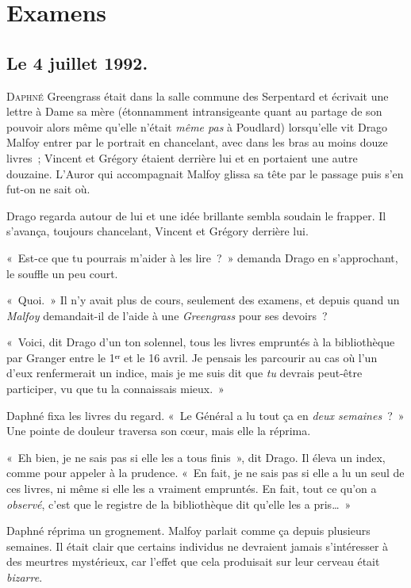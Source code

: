 \chapter{Examens}

\section{Le 4 juillet 1992.}

\lettrine{D}{aphné} Greengrass était dans la salle commune des Serpentard et écrivait une lettre à Dame sa mère (étonnamment intransigeante quant au partage de son pouvoir alors même qu'elle n'était \emph{même pas} à Poudlard) lorsqu'elle vit Drago Malfoy entrer par le portrait en chancelant, avec dans les bras au moins douze livres~; Vincent et Grégory étaient derrière lui et en portaient une autre douzaine. L'Auror qui accompagnait Malfoy glissa sa tête par le passage puis s'en fut-on ne sait où.

Drago regarda autour de lui et une idée brillante sembla soudain le frapper. Il s'avança, toujours chancelant, Vincent et Grégory derrière lui.

«~Est-ce que tu pourrais m'aider à les lire~?~» demanda Drago en s'approchant, le souffle un peu court.

«~Quoi.~» Il n'y avait plus de cours, seulement des examens, et depuis quand un \emph{Malfoy} demandait-il de l'aide à une \emph{Greengrass} pour ses devoirs~?

«~Voici, dit Drago d'un ton solennel, tous les livres empruntés à la bibliothèque par Granger entre le 1ᵉʳ et le 16 avril. Je pensais les parcourir au cas où l'un d'eux renfermerait un indice, mais je me suis dit que \emph{tu} devrais peut-être participer, vu que tu la connaissais mieux.~»

Daphné fixa les livres du regard. «~Le Général a lu tout ça en \emph{deux semaines}~?~» Une pointe de douleur traversa son cœur, mais elle la réprima.

«~Eh bien, je ne sais pas si elle les a tous finis~», dit Drago. Il éleva un index, comme pour appeler à la prudence. «~En fait, je ne sais pas si elle a lu un seul de ces livres, ni même si elle les a vraiment empruntés. En fait, tout ce qu'on a \emph{observé}, c'est que le registre de la bibliothèque dit qu'elle les a pris…~»

Daphné réprima un grognement. Malfoy parlait comme ça depuis plusieurs semaines. Il était clair que certains individus ne devraient jamais s'intéresser à des meurtres mystérieux, car l'effet que cela produisait sur leur cerveau était \emph{bizarre}.

